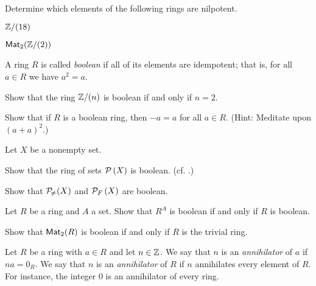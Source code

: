 \begin{exercise}
Determine which elements of the following rings are nilpotent.
\begin{proplist*}
\item \(\mathbb{Z}/(18)\)
\item \(\mathsf{Mat}_{2}(\mathbb{Z}/(2))\)
\end{proplist*}
\end{exercise}

\begin{dfn} \label{dfn:boolean-ring}
A ring \(R\) is called \emph{boolean} if all of its elements are idempotent; that is, for all \(a \in R\) we have \(a^2 = a\).
\end{dfn}

\begin{exercise}
Show that the ring \(\mathbb{Z}/(n)\) is boolean if and only if \(n = 2\).
\end{exercise}

\begin{exercise} \label{exerc:boolean-neg}
Show that if \(R\) is a boolean ring, then \(-a = a\) for all \(a \in R\).
(Hint: Meditate upon \((a+a)^2\).)
\end{exercise}

\begin{exercise}
Let \(X\) be a nonempty set.
\begin{proplist*}
\item Show that the ring of sets \(\mathcal{P}\left(X\right)\) is boolean.
(cf. .)
\item Show that \(\mathcal{P}_{\!\neq\!}\left(X\right)\) and \(\mathcal{P}_F\left(X\right)\) are boolean.
\end{proplist*}
\end{exercise}

\begin{exercise}
Let \(R\) be a ring and \(A\) a set.
Show that \(R^A\) is boolean if and only if \(R\) is boolean.
\end{exercise}

\begin{exercise}
Show that \(\mathsf{Mat}_{2}(R)\) is boolean if and only if \(R\) is the trivial ring.
\end{exercise}

\begin{dfn} \label{dfn:zz-annihilator}
Let \(R\) be a ring with \(a \in R\) and let \(n \in \mathbb{Z}\).
We say that \(n\) is an \emph{annihilator} of \(a\) if \(na = 0_R\).
We say that \(n\) is an \emph{annihilator} of \(R\) if \(n\) annihilates every element of \(R\).
For instance, the integer 0 is an annihilator of every ring.
\end{dfn}

